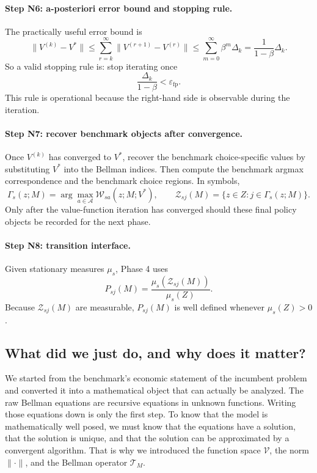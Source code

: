 \paragraph{Step N6: a-posteriori error bound and stopping rule.}
The practically useful error bound is
\[
\|V^{(k)}-V^*\|
\le
\sum_{r=k}^{\infty}\|V^{(r+1)}-V^{(r)}\|
\le
\sum_{m=0}^{\infty}\beta^m\Delta_k
=
\frac{1}{1-\beta}\Delta_k.
\]
So a valid stopping rule is: stop iterating once
\[
\frac{\Delta_k}{1-\beta}<\varepsilon_{\mathrm{fp}}.
\]
This rule is operational because the right-hand side is observable during the iteration.

\paragraph{Step N7: recover benchmark objects after convergence.}
Once $V^{(k)}$ has converged to $V^*$, recover the benchmark choice-specific values by substituting $V^*$ into the Bellman indices. Then compute the benchmark argmax correspondence and the benchmark choice regions. In symbols,
\[
\Gamma_s(z;M)=\arg\max_{a\in\mathcal A}\mathcal W_{sa}(z;M;V^*),
\qquad
\mathcal Z_{sj}(M)=\{z\in Z:j\in\Gamma_s(z;M)\}.
\]
Only after the value-function iteration has converged should these final policy objects be recorded for the next phase.

\paragraph{Step N8: transition interface.}
Given stationary measures $\mu_s$, Phase 4 uses
\[
P_{sj}(M)=\frac{\mu_s(\mathcal Z_{sj}(M))}{\mu_s(Z)}.
\]
Because $\mathcal Z_{sj}(M)$ are measurable, $P_{sj}(M)$ is well defined whenever $\mu_s(Z)>0$.

\subsection{What did we just do, and why does it matter?}

We started from the benchmark's economic statement of the incumbent problem and converted it into a mathematical object that can actually be analyzed. The raw Bellman equations are recursive equations in unknown functions. Writing those equations down is only the first step. To know that the model is mathematically well posed, we must know that the equations have a solution, that the solution is unique, and that the solution can be approximated by a convergent algorithm. That is why we introduced the function space $\mathcal V$, the norm $\|\cdot\|$, and the Bellman operator $\mathcal T_M$.

